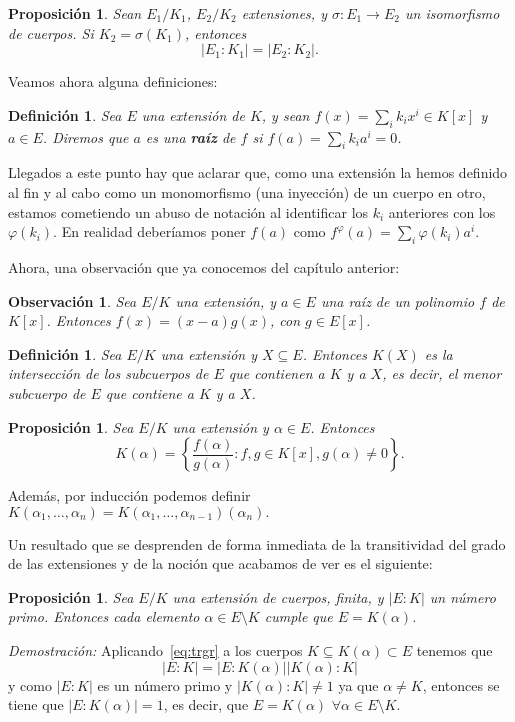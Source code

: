 \documentclass[12pt]{article}
\newtheorem{proposition}[theorem]{Proposición}
\newtheorem{definition}[theorem]{Definición}
\newtheorem{observation}{Observación}[theorem]
\begin{document}
\begin{proposition}\label{eq:propprinp} Sean $E_{1}/K_{1}$, $E_{2}/K_{2}$ extensiones, y $\sigma \colon E_{1} \longrightarrow E_{2}$ un isomorfismo de cuerpos. Si $K_{2} = \sigma (K_{1})$, entonces $$|E_{1}:K_{1}| = |E_{2}:K_{2}|.$$
\end{proposition}

Veamos ahora alguna definiciones:
\begin{definition}\label{defac} Sea $E$ una extensión de $K$, y sean $f(x) = \sum_{i} k_{i}x^{i} \in K[x]$ y $a \in E$. Diremos que $a$ es una \textbf{raíz} de $f$ si $f(a) = \sum_{i} k_{i}a^{i} = 0$.
\end{definition}

Llegados  a este punto hay que aclarar que, como una extensión la hemos definido al fin y al cabo como un monomorfismo (una inyección) de un cuerpo en otro, estamos cometiendo un abuso de notación al identificar los $k_{i}$ anteriores con los $\varphi (k_{i})$. En realidad deberíamos poner $f(a)$ como $f^{\varphi} (a) = \sum_{i} \varphi(k_{i}) a^{i}$.

Ahora, una observación que ya conocemos del capítulo anterior:
\begin{observation} Sea $E/K$ una extensión, y $a \in E$ una raíz de un polinomio $f$ de $K[x]$. Entonces $f(x) = (x-a)g(x)$, con $g \in E[x]$.
\end{observation} 

\begin{definition} Sea $E/K$ una extensión y $X \subseteq E$. Entonces $K(X)$ es la intersección de los subcuerpos de $E$ que contienen a $K$ y a $X$, es decir, el menor subcuerpo de $E$ que contiene a $K$ y a $X$.
\end{definition}

\begin{proposition} \label{eq:kalfa} Sea $E/K$ una extensión y $\alpha \in E$. Entonces $$K (\alpha) = \left\lbrace \dfrac{f(\alpha)}{g(\alpha)} : f,g \in K[x], g(\alpha) \neq 0 \right\rbrace.$$
\end{proposition}

Además, por inducción podemos definir $K(\alpha_{1}, \ldots, \alpha_{n} ) = K(\alpha_{1}, \ldots, \alpha_{n-1})(\alpha_{n}).$

Un resultado que se desprenden de forma inmediata de la transitividad del grado de las extensiones y de la noción que acabamos de ver es el siguiente:
\begin{proposition} Sea $E/K$ una extensión de cuerpos, finita, y $|E:K|$ un número primo. Entonces cada elemento $\alpha \in E \setminus K$ cumple que $E = K(\alpha)$.
\end{proposition}
\emph{Demostración: } Aplicando~\ref{eq:trgr} a los cuerpos $K \subseteq K(\alpha) \subset E$ tenemos que $$|E:K| = |E: K(\alpha)| |K(\alpha) : K|$$ y como $|E:K|$ es un número primo y $|K(\alpha) :K| \neq 1$ ya que $\alpha \neq K$, entonces se tiene que $|E:K(\alpha)| = 1$, es decir, que $E = K(\alpha)$ $\forall \alpha \in E \setminus K$.
\end{document}

